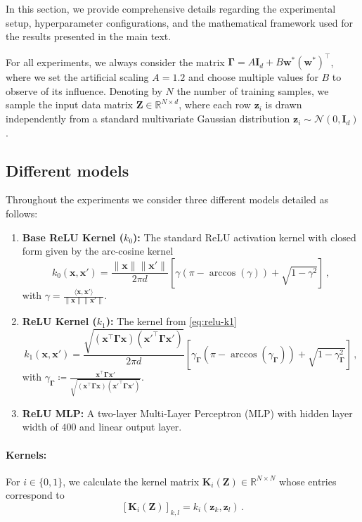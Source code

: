 \label{app:experimental_details}

In this section, we provide comprehensive details regarding the experimental setup, hyperparameter configurations, and the mathematical framework used for the results presented in the main text.

For all experiments, we always consider the matrix $\bm \Gamma = A \bm I_d + B \bm w^* (\bm w^*)^\top$, where we set the artificial scaling $A = 1.2$ and choose multiple values for $B$ to observe of its influence. Denoting by $N$ the number of training samples, we sample the input data matrix $\bm {Z} \in \mathbb{R}^{N \times d}$, where each row $\bm {z}_i$ is drawn independently from a standard multivariate Gaussian distribution $\bm {z}_i \sim \mathcal{N}(0, \bm {I}_d)$.


\subsection{Different models}
Throughout the experiments we consider three different models detailed as follows:
\begin{enumerate}[leftmargin=*,topsep=0.5mm, itemsep=0.mm]
    \item \textbf{Base ReLU Kernel ($k_0$):} The standard ReLU activation kernel with closed form given by the arc-cosine kernel
    \[
        k_0(\bm x, \bm x') = \frac{\|\bm x\|\|\bm x'\|}{2\pi d}\left[\gamma(\pi -\arccos (\gamma)) + \sqrt{1 - \gamma^2}\right]\, ,
    \]
    with $\gamma = \frac{\langle \bm x, \bm x'\rangle}{\|\bm x\| \|\bm x'\|}$.
    \item \textbf{ReLU Kernel ($k_1$):} The kernel from \cref{eq:relu-k1} \[
        k_1(\bm x, \bm x') = \frac{\sqrt{(\bm x^\top \bm \Gamma \bm x)(\bm x'^\top \bm \Gamma \bm x')}}{2\pi d}\left[\gamma_{\bm \Gamma}(\pi -\arccos (\gamma_{\bm \Gamma})) +\sqrt{1 - \gamma_{\bm \Gamma}^2}\right]\,,
    \]
    with $\gamma_{\bm \Gamma} \coloneqq \frac{\bm x^\top \bm \Gamma \bm x'}{\sqrt{(\bm x^\top \bm \Gamma \bm x)(\bm x'^\top \bm \Gamma \bm x')}}$.
    \item \textbf{ReLU MLP:} A two-layer Multi-Layer Perceptron (MLP) with hidden layer width of $400$ and linear output layer. 
\end{enumerate}
\paragraph{Kernels:}
For $i \in \{0, 1\}$, we calculate the kernel matrix $\bm K_i(\bm Z) \in \mathbb R^{N\times N}$ whose entries correspond to
\[ 
    [\bm K_i(\bm Z)]_{k,l} = k_i(\bm z_k, \bm z_l)\, .
\]

